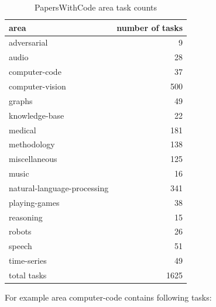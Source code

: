 \documentclass[longabstract,mgr,english]{iithesis}
\begin{document}
\begin{table}[htbp]
\centering
  \caption{PapersWithCode area task counts}
  \begin{tabular}{|l|r|}
\hline
area & number of tasks\\
\hline
adversarial & 9\\
audio & 28\\
computer-code & 37\\
computer-vision & 500\\
graphs & 49\\
knowledge-base & 22\\
medical & 181\\
methodology & 138\\
miscellaneous & 125\\
music & 16\\
natural-language-processing & 341\\
playing-games & 38\\
reasoning & 15\\
robots & 26\\
speech & 51\\
time-series & 49\\
\hline
total tasks & 1625\\
\hline
  \end{tabular}
  \end{table}

For example area computer-code contains following tasks:
\end{document}
